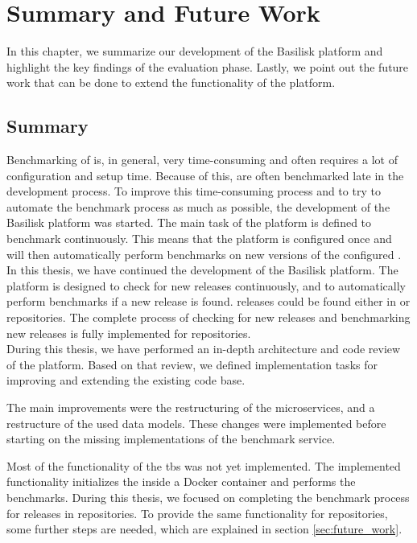 \chapter{Summary and Future Work}
\label{ch:summary}

In this chapter, we summarize our development of the Basilisk platform and highlight the key findings of the evaluation phase.
Lastly, we point out the future work that can be done to extend the functionality of the platform.

\section{Summary}
Benchmarking of \tsp{} is, in general, very time-consuming and often requires a lot of configuration and setup time.
Because of this, \tsp{} are often benchmarked late in the development process.
To improve this time-consuming process and to try to automate the benchmark process as much as possible, the development of the Basilisk platform was started.
The main task of the platform is defined to benchmark \tsp{} continuously.
This means that the platform is configured once and will then automatically perform benchmarks on new versions of the configured \tsp{}.
\\

In this thesis, we have continued the development of the Basilisk platform.
The platform is designed to check for new \ts{} releases continuously, and to automatically perform benchmarks if a new release is found.
\ts{} releases could be found either in \dockh{} or \gh{} repositories.
The complete process of checking for new releases and benchmarking new releases is fully implemented for \dockh{} repositories.
\\

During this thesis, we have performed an in-depth architecture and code review of the platform.
Based on that review, we defined implementation tasks for improving and extending the existing code base.

The main improvements were the restructuring of the microservices, and a restructure of the used data models.
These changes were implemented before starting on the missing implementations of the benchmark service.

Most of the functionality of the \acl{tbs} was not yet implemented.
The implemented functionality initializes the \ts{} inside a Docker container and performs the benchmarks.
During this thesis, we focused on completing the benchmark process for \ts{} releases in \dockh{} repositories.
To provide the same functionality for \gh{} repositories, some further steps are needed, which are explained in section \ref{sec:future_work}.

